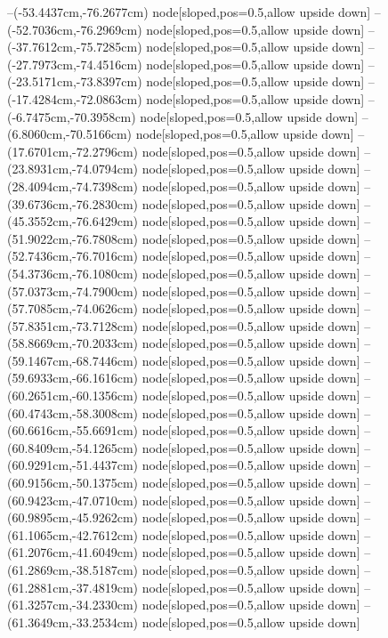 --(-53.4437cm,-76.2677cm) node[sloped,pos=0.5,allow upside down]{\ArrowIn}
--(-52.7036cm,-76.2969cm) node[sloped,pos=0.5,allow upside down]{\arrowIn}
--(-37.7612cm,-75.7285cm) node[sloped,pos=0.5,allow upside down]{\ArrowIn}
--(-27.7973cm,-74.4516cm) node[sloped,pos=0.5,allow upside down]{\ArrowIn}
--(-23.5171cm,-73.8397cm) node[sloped,pos=0.5,allow upside down]{\ArrowIn}
--(-17.4284cm,-72.0863cm) node[sloped,pos=0.5,allow upside down]{\ArrowIn}
--(-6.7475cm,-70.3958cm) node[sloped,pos=0.5,allow upside down]{\ArrowIn}
--(6.8060cm,-70.5166cm) node[sloped,pos=0.5,allow upside down]{\ArrowIn}
--(17.6701cm,-72.2796cm) node[sloped,pos=0.5,allow upside down]{\ArrowIn}
--(23.8931cm,-74.0794cm) node[sloped,pos=0.5,allow upside down]{\ArrowIn}
--(28.4094cm,-74.7398cm) node[sloped,pos=0.5,allow upside down]{\ArrowIn}
--(39.6736cm,-76.2830cm) node[sloped,pos=0.5,allow upside down]{\ArrowIn}
--(45.3552cm,-76.6429cm) node[sloped,pos=0.5,allow upside down]{\ArrowIn}
--(51.9022cm,-76.7808cm) node[sloped,pos=0.5,allow upside down]{\ArrowIn}
--(52.7436cm,-76.7016cm) node[sloped,pos=0.5,allow upside down]{\arrowIn}
--(54.3736cm,-76.1080cm) node[sloped,pos=0.5,allow upside down]{\ArrowIn}
--(57.0373cm,-74.7900cm) node[sloped,pos=0.5,allow upside down]{\ArrowIn}
--(57.7085cm,-74.0626cm) node[sloped,pos=0.5,allow upside down]{\arrowIn}
--(57.8351cm,-73.7128cm) node[sloped,pos=0.5,allow upside down]{\arrowIn}
--(58.8669cm,-70.2033cm) node[sloped,pos=0.5,allow upside down]{\ArrowIn}
--(59.1467cm,-68.7446cm) node[sloped,pos=0.5,allow upside down]{\ArrowIn}
--(59.6933cm,-66.1616cm) node[sloped,pos=0.5,allow upside down]{\ArrowIn}
--(60.2651cm,-60.1356cm) node[sloped,pos=0.5,allow upside down]{\ArrowIn}
--(60.4743cm,-58.3008cm) node[sloped,pos=0.5,allow upside down]{\ArrowIn}
--(60.6616cm,-55.6691cm) node[sloped,pos=0.5,allow upside down]{\ArrowIn}
--(60.8409cm,-54.1265cm) node[sloped,pos=0.5,allow upside down]{\ArrowIn}
--(60.9291cm,-51.4437cm) node[sloped,pos=0.5,allow upside down]{\ArrowIn}
--(60.9156cm,-50.1375cm) node[sloped,pos=0.5,allow upside down]{\ArrowIn}
--(60.9423cm,-47.0710cm) node[sloped,pos=0.5,allow upside down]{\ArrowIn}
--(60.9895cm,-45.9262cm) node[sloped,pos=0.5,allow upside down]{\ArrowIn}
--(61.1065cm,-42.7612cm) node[sloped,pos=0.5,allow upside down]{\ArrowIn}
--(61.2076cm,-41.6049cm) node[sloped,pos=0.5,allow upside down]{\ArrowIn}
--(61.2869cm,-38.5187cm) node[sloped,pos=0.5,allow upside down]{\ArrowIn}
--(61.2881cm,-37.4819cm) node[sloped,pos=0.5,allow upside down]{\ArrowIn}
--(61.3257cm,-34.2330cm) node[sloped,pos=0.5,allow upside down]{\ArrowIn}
--(61.3649cm,-33.2534cm) node[sloped,pos=0.5,allow upside down]{\arrowIn}
